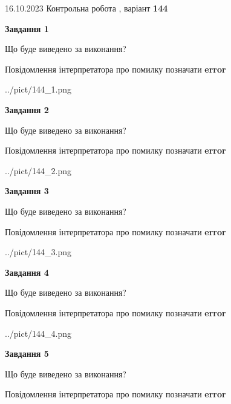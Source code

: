 \documentclass[12pt, ukrainian]{article}
\begin{document}
{\Large{16.10.2023 Контрольна робота , варіант  \No \textbf { 144 }\par}}
{
\begin {large}
{\begin {center}\textbf{Завдання 1}\end {center}}\par
Що буде виведено за виконання? \par
Повідомлення інтерпретатора про помилку позначати \textbf{error}

\begin{center}
	{../pict/144_1.png}
\end{center}
\newpage

{\begin {center}\textbf{Завдання 2}\end {center}}\par
Що буде виведено за виконання? \par
Повідомлення інтерпретатора про помилку позначати \textbf{error}

\begin{center}
	{../pict/144_2.png}
\end{center}
\newpage

{\begin {center}\textbf{Завдання 3}\end {center}}\par
Що буде виведено за виконання? \par
Повідомлення інтерпретатора про помилку позначати \textbf{error}

\begin{center}
	{../pict/144_3.png}
\end{center}
\newpage

{\begin {center}\textbf{Завдання 4}\end {center}}\par
Що буде виведено за виконання? \par
Повідомлення інтерпретатора про помилку позначати \textbf{error}

\begin{center}
	{../pict/144_4.png}
\end{center}
\newpage

{\begin {center}\textbf{Завдання 5}\end {center}}\par
Що буде виведено за виконання? \par
Повідомлення інтерпретатора про помилку позначати \textbf{error}


\end{large}}
\end{document}
